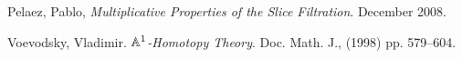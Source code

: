 \documentclass{amsart}%
\begin{document}
\begin{thebibliography}{OOOO}
     Pelaez, Pablo, {\it Multiplicative Properties
    of the Slice Filtration}.  December 2008.






     Voevodsky, Vladimir. {\it $\mathbb{A}^1$-Homotopy
    Theory}. Doc. Math. J., (1998) pp. 579--604.

\end{thebibliography}
\end{document}
